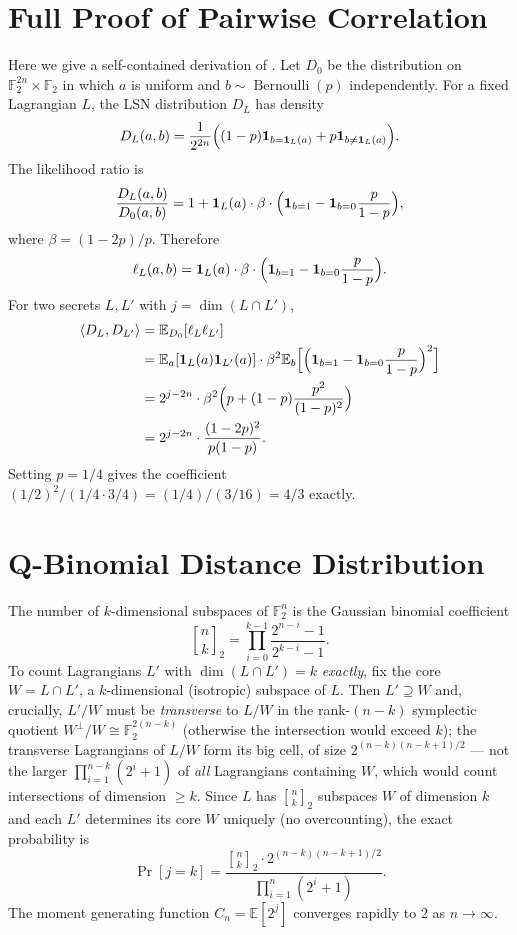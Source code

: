 \documentclass[11pt,a4paper]{article}
\theoremstyle{plain}
\theoremstyle{definition}
\newcommand{\F}{\mathbb{F}}
\newcommand{\E}{\mathbb{E}}
\begin{document}
\appendix

\section{Full Proof of Pairwise Correlation}
\label{app:corr}

Here we give a self-contained derivation of . Let $D_0$ be the distribution on $\F_2^{2n} \times \F_2$ in which $a$ is uniform and $b \sim \operatorname{Bernoulli}(p)$ independently. For a fixed Lagrangian $L$, the LSN distribution $D_L$ has density
\[
D_L(a,b) = \frac{1}{2^{2n}} \Bigl( (1-p)\mathbf{1}_{b=\mathbf{1}_L(a)} + p\mathbf{1}_{b \neq \mathbf{1}_L(a)} \Bigr).
\]
The likelihood ratio is
\[
\frac{D_L(a,b)}{D_0(a,b)} = 1 + \mathbf{1}_L(a) \cdot \beta \cdot \Bigl(\mathbf{1}_{b=1} - \mathbf{1}_{b=0}\frac{p}{1-p}\Bigr),
\]
where $\beta = (1-2p)/p$. Therefore
\[
\ell_L(a,b) = \mathbf{1}_L(a) \cdot \beta \cdot \Bigl(\mathbf{1}_{b=1} - \mathbf{1}_{b=0}\frac{p}{1-p}\Bigr).
\]
For two secrets $L,L'$ with $j = \dim(L \cap L')$,
\begin{align*}
\langle D_L, D_{L'} \rangle
&= \E_{D_0}[\ell_L \ell_{L'}] \\
&= \E_a[\mathbf{1}_L(a)\mathbf{1}_{L'}(a)] \cdot
   \beta^2 \E_b\Bigl[\Bigl(\mathbf{1}_{b=1} - \mathbf{1}_{b=0}\frac{p}{1-p}\Bigr)^2\Bigr] \\
&= 2^{j-2n} \cdot \beta^2 \Bigl( p + (1-p)\frac{p^2}{(1-p)^2} \Bigr) \\
&= 2^{j-2n} \cdot \frac{(1-2p)^2}{p(1-p)}.
\end{align*}
Setting $p=1/4$ gives the coefficient $(1/2)^2 / (1/4 \cdot 3/4) = (1/4)/(3/16) = 4/3$ exactly.

\section{Q-Binomial Distance Distribution}
\label{app:qbin}

The number of $k$-dimensional subspaces of $\F_2^n$ is the Gaussian binomial coefficient
\[
{n \brack k}_2 = \prod_{i=0}^{k-1} \frac{2^{n-i}-1}{2^{k-i}-1}.
\]
To count Lagrangians $L'$ with $\dim(L\cap L')=k$ \emph{exactly}, fix the core $W=L\cap L'$, a $k$-dimensional (isotropic) subspace of $L$. Then $L'\supseteq W$ and, crucially, $L'/W$ must be \emph{transverse} to $L/W$ in the rank-$(n-k)$ symplectic quotient $W^\perp/W\cong\F_2^{2(n-k)}$ (otherwise the intersection would exceed $k$); the transverse Lagrangians of $L/W$ form its big cell, of size $2^{(n-k)(n-k+1)/2}$ --- not the larger $\prod_{i=1}^{n-k}(2^i+1)$ of \emph{all} Lagrangians containing $W$, which would count intersections of dimension $\ge k$. Since $L$ has ${n\brack k}_2$ subspaces $W$ of dimension $k$ and each $L'$ determines its core $W$ uniquely (no overcounting), the exact probability is
\[
\Pr[j=k] = \frac{{n \brack k}_2 \cdot 2^{(n-k)(n-k+1)/2}}{\prod_{i=1}^n (2^i+1)}.
\]
The moment generating function $C_n = \E[2^j]$ converges rapidly to $2$ as $n \to \infty$.
\end{document}

